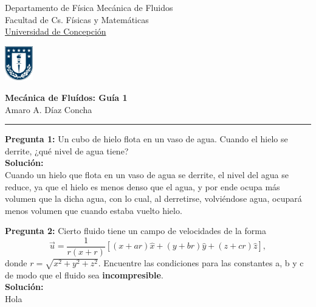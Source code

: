 \documentclass[11pt,letterpaper]{article}
\begin{document}

\usetikzlibrary{positioning}
\pagestyle{plain}
\begin{flushleft}
Departamento de Física \hfill Mecánica de Fluidos\\
Facultad de Cs. Físicas y Matemáticas\\
\underline{Universidad de Concepción}
\end{flushleft}

\begin{flushright}\vspace{-5mm}
\includegraphics[height=1.5cm]{escudo .jpg}
\end{flushright}
 
\begin{center}\vspace{-1cm}
\textbf{\large Mecánica de Fluídos: Guía 1}\\   %
Amaro A. Díaz Concha\\                         %
\end{center}
\rule{\linewidth}{0.1mm}
\textbf{Pregunta 1:} Un cubo de hielo flota en un vaso de agua. Cuando el hielo se derrite, ¿qué nivel de agua tiene? \\
\textbf{Solución:} \\ 
Cuando un hielo que flota en un vaso de agua se derrite, el nivel del agua se reduce, ya que el hielo es menos denso que el agua, y por ende ocupa más volumen que la dicha agua, con lo cual, al derretirse, volviéndose agua, ocupará menos volumen que cuando estaba vuelto hielo.

\textbf{Pregunta 2:} Cierto fluido tiene un campo de velocidades de la forma
\begin{equation}
    \vec{u} = \frac{1}{r(x+r)} [(x+ar)\hat{x} + (y+br)\hat{y} + (z+cr)\hat{z}],
\end{equation}
donde $r=\sqrt{x^2+y^2+z^2}$. Encuentre las condiciones para las constantes a, b y c de modo que el fluido sea \textbf{incompresible}. \\
\textbf{Solución:} \\
Hola
\end{document}
